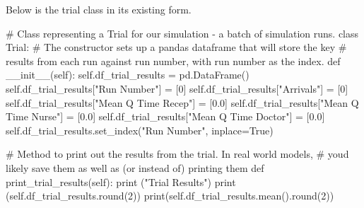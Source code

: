 \documentclass[
  letterpaper,
  DIV=11,
  numbers=noendperiod]{scrreprt}
\newenvironment{Shaded}{}{}
\newcommand{\BuiltInTok}[1]{\textcolor[rgb]{0.84,0.23,0.29}{#1}}
\newcommand{\CommentTok}[1]{\textcolor[rgb]{0.42,0.45,0.49}{#1}}
\newcommand{\DecValTok}[1]{\textcolor[rgb]{0.00,0.36,0.77}{#1}}
\newcommand{\FloatTok}[1]{\textcolor[rgb]{0.00,0.36,0.77}{#1}}
\newcommand{\FunctionTok}[1]{\textcolor[rgb]{0.44,0.26,0.76}{#1}}
\newcommand{\KeywordTok}[1]{\textcolor[rgb]{0.84,0.23,0.29}{#1}}
\newcommand{\NormalTok}[1]{\textcolor[rgb]{0.14,0.16,0.18}{#1}}
\newcommand{\OperatorTok}[1]{\textcolor[rgb]{0.14,0.16,0.18}{#1}}
\newcommand{\StringTok}[1]{\textcolor[rgb]{0.01,0.18,0.38}{#1}}
\newcommand{\VariableTok}[1]{\textcolor[rgb]{0.89,0.38,0.04}{#1}}
\begin{document}
Below is the trial class in its existing form.

\begin{Shaded}
\begin{Highlighting}[]
\CommentTok{\# Class representing a Trial for our simulation {-} a batch of simulation runs.}
\KeywordTok{class}\NormalTok{ Trial:}
    \CommentTok{\# The constructor sets up a pandas dataframe that will store the key}
    \CommentTok{\# results from each run against run number, with run number as the index.}
    \KeywordTok{def}  \FunctionTok{\_\_init\_\_}\NormalTok{(}\VariableTok{self}\NormalTok{):}
        \VariableTok{self}\NormalTok{.df\_trial\_results }\OperatorTok{=}\NormalTok{ pd.DataFrame()}
        \VariableTok{self}\NormalTok{.df\_trial\_results[}\StringTok{"Run Number"}\NormalTok{] }\OperatorTok{=}\NormalTok{ [}\DecValTok{0}\NormalTok{]}
        \VariableTok{self}\NormalTok{.df\_trial\_results[}\StringTok{"Arrivals"}\NormalTok{] }\OperatorTok{=}\NormalTok{ [}\DecValTok{0}\NormalTok{]}
        \VariableTok{self}\NormalTok{.df\_trial\_results[}\StringTok{"Mean Q Time Recep"}\NormalTok{] }\OperatorTok{=}\NormalTok{ [}\FloatTok{0.0}\NormalTok{]}
        \VariableTok{self}\NormalTok{.df\_trial\_results[}\StringTok{"Mean Q Time Nurse"}\NormalTok{] }\OperatorTok{=}\NormalTok{ [}\FloatTok{0.0}\NormalTok{]}
        \VariableTok{self}\NormalTok{.df\_trial\_results[}\StringTok{"Mean Q Time Doctor"}\NormalTok{] }\OperatorTok{=}\NormalTok{ [}\FloatTok{0.0}\NormalTok{]}
        \VariableTok{self}\NormalTok{.df\_trial\_results.set\_index(}\StringTok{"Run Number"}\NormalTok{, inplace}\OperatorTok{=}\VariableTok{True}\NormalTok{)}

    \CommentTok{\# Method to print out the results from the trial.  In real world models,}
    \CommentTok{\# you\textquotesingle{}d likely save them as well as (or instead of) printing them}
    \KeywordTok{def}\NormalTok{ print\_trial\_results(}\VariableTok{self}\NormalTok{):}
        \BuiltInTok{print}\NormalTok{ (}\StringTok{"Trial Results"}\NormalTok{)}
        \BuiltInTok{print}\NormalTok{ (}\VariableTok{self}\NormalTok{.df\_trial\_results.}\BuiltInTok{round}\NormalTok{(}\DecValTok{2}\NormalTok{))}
        \BuiltInTok{print}\NormalTok{(}\VariableTok{self}\NormalTok{.df\_trial\_results.mean().}\BuiltInTok{round}\NormalTok{(}\DecValTok{2}\NormalTok{))}


\end{Highlighting}
\end{Shaded}
\end{document}
